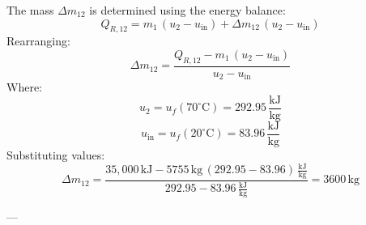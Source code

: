 The mass \( \Delta m_{12} \) is determined using the energy balance:  
\[
Q_{R,12} = m_1 \, (u_2 - u_{\text{in}}) + \Delta m_{12} \, (u_2 - u_{\text{in}})
\]  
Rearranging:  
\[
\Delta m_{12} = \frac{Q_{R,12} - m_1 \, (u_2 - u_{\text{in}})}{u_2 - u_{\text{in}}}
\]  
Where:  
\[
u_2 = u_f(70^\circ\text{C}) = 292.95 \, \frac{\text{kJ}}{\text{kg}}
\]  
\[
u_{\text{in}} = u_f(20^\circ\text{C}) = 83.96 \, \frac{\text{kJ}}{\text{kg}}
\]  
Substituting values:  
\[
\Delta m_{12} = \frac{35,000 \, \text{kJ} - 5755 \, \text{kg} \, (292.95 - 83.96) \, \frac{\text{kJ}}{\text{kg}}}{292.95 - 83.96 \, \frac{\text{kJ}}{\text{kg}}} = 3600 \, \text{kg}
\]

---